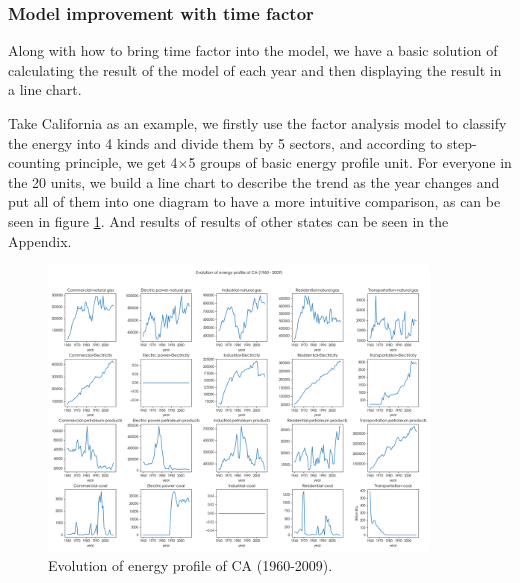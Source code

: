 \documentclass[a4paper,11pt]{article}
\begin{document}
\subsubsection{Model improvement with time factor}
\par Along with how to bring time factor into the model, we have a basic solution of calculating the result of the model of each year and then displaying the result in a line chart. 

\par Take California as an example, we firstly use the factor analysis model to classify the energy into 4 kinds and divide them by 5 sectors, and according to step-counting principle, we get 4$\times$5 groups of basic energy profile unit. For everyone in the 20 units, we build a line chart to describe the trend as the year changes and put all of them into one diagram to have a more intuitive comparison, as can be seen in figure \ref{fig:part-2-CA}. And results of results of other states can be seen in the Appendix. %

\begin{figure}[H]%
    \centering 
    \includegraphics[width=0.9\textwidth]{./Pic/B-classify-CA.png}
    \caption{Evolution of energy profile of CA (1960-2009).}
    \label{fig:part-2-CA}  
\end{figure}

\end{document}
